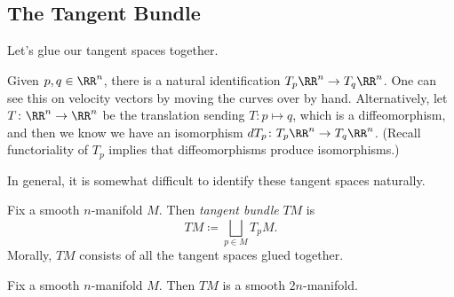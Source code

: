 \documentclass[../notes.tex]{subfiles}
\begin{document}
\subsection{The Tangent Bundle}
Let's glue our tangent spaces together.
\begin{remark}
	Given $p,q\in\RR^n$, there is a natural identification $T_p\RR^n\to T_q\RR^n$. One can see this on velocity vectors by moving the curves over by hand. Alternatively, let $T\colon\RR^n\to\RR^n$ be the translation sending $T\colon p\mapsto q$, which is a diffeomorphism, and then we know we have an isomorphism $dT_p\colon T_p\RR^n\to T_q\RR^n$. (Recall functoriality of $T_p$ implies that diffeomorphisms produce isomorphisms.)
\end{remark}
In general, it is somewhat difficult to identify these tangent spaces naturally.
\begin{definition}
	Fix a smooth $n$-manifold $M$. Then \textit{tangent bundle} $TM$ is
	\[TM\coloneqq\bigsqcup_{p\in M}T_pM.\]
	Morally, $TM$ consists of all the tangent spaces glued together.
\end{definition}
\begin{proposition}
	Fix a smooth $n$-manifold $M$. Then $TM$ is a smooth $2n$-manifold.
\end{proposition}
\end{document}
